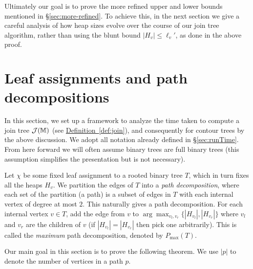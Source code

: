 \documentclass[11pt]{article}
\theoremstyle{definition}
\newcommand{\cJ}{{\cal J}}
\newcommand{\MM}{\mathbb{M}}
\newcommand{\Sec}[1]{\hyperref[sec:#1]{\S\ref*{sec:#1}}} %
\newcommand{\Def}[1]{\hyperref[def:#1]{Definition~\ref*{def:#1}}} %
\newcommand{\pmax}{P_{\max}}
\begin{document}
Ultimately our goal is to prove the more refined upper and lower bounds mentioned in \Sec{more-refined}.  
To achieve this, in the next section we give a careful analysis of how heap sizes evolve over the course of our join tree algorithm, 
rather than using the blunt bound $|H_v|\leq \ell_v'$, as done in the above proof. 



\section{Leaf assignments and path decompositions}
\label{sec:pathDecomp}

In this section, we set up a framework to analyze the time taken to compute a join tree $\cJ(\MM)$ (see \Def{join}), and consequently for contour trees by the above discussion.
We adopt all notation already defined in \Sec{runTime}.  From here forward we will often assume binary trees are full binary trees 
(this assumption simplifies the presentation but is not necessary).

Let $\chi$ be some fixed leaf assignment to a rooted binary tree $T$, which in turn fixes all the heaps $H_v$. 
We partition the edges of $T$ into a \emph{path decomposition}, where each set of the partition (a path) 
is a subset of edges in $T$ with each internal
vertex of degree at most $2$. This naturally gives a path decomposition.
For each internal vertex $v\in T$, add the edge from $v$ to $\arg \max_{v_l, v_r} \{|H_{v_l}|, |H_{v_r}|\}$ 
 where $v_l$ and $v_r$ are the children of $v$ (if $|H_{v_l}|=|H_{v_r}|$ then pick one arbitrarily).
This is called the \emph{maximum} path decomposition, denoted by $\pmax(T)$.

Our main goal in this section is to prove the following theorem.  We use $|p|$ to denote the number of vertices in a path $p$.
\end{document}
